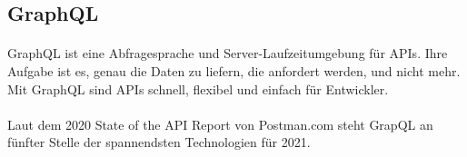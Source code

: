 \subsection{GraphQL}
\paragraph{}
GraphQL ist eine Abfragesprache und Server-Laufzeitumgebung für APIs.
Ihre Aufgabe ist es, genau die Daten zu liefern, die anfordert werden, und nicht mehr.
\\
Mit GraphQL sind APIs schnell, flexibel und einfach für Entwickler.
\\ \\
Laut dem 2020 State of the API Report von Postman.com steht GrapQL an fünfter Stelle der spannendsten Technologien für 2021.

